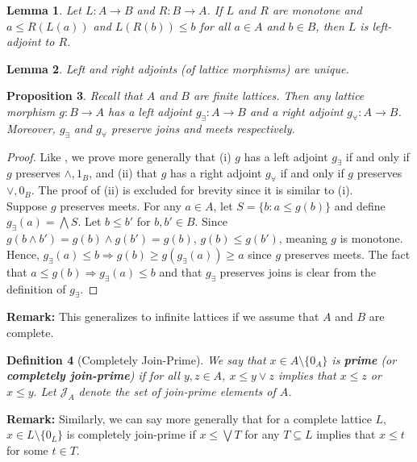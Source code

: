 \documentclass{article}
\newtheorem{proposition}{Proposition}[section]
\newtheorem{lemma}[proposition]{Lemma}
\newtheorem{definition}[proposition]{Definition}
\numberwithin{equation}{section}
\newcommand{\meet}{\wedge}
\newcommand{\join}{\vee}
\newcommand{\bigmeet}{\bigwedge}
\newcommand{\bigjoin}{\bigvee}
\begin{document}
\begin{lemma}
Let $L : A \to B$ and $R : B \to A$. If $L$ and $R$ are monotone and $a \leq R(L(a))$ and $L(R(b)) \leq b$ for all $a \in A$ and $b \in B$, then $L$ is left-adjoint to $R$.
\end{lemma}

\begin{lemma}
Left and right adjoints (of lattice morphisms) are unique.
\end{lemma}

\begin{proposition}
Recall that $A$ and $B$ are finite lattices. Then any lattice morphism $g : B \to A$ has a left adjoint $g_\exists : A \to B$ and a right adjoint $g_\forall : A \to B$. Moreover, $g_\exists$ and $g_\forall$ preserve joins and meets respectively.
\end{proposition}

\begin{proof}
Like , we prove more generally that (i) $g$ has a left adjoint $g_\exists$ if and only if $g$ preserves $\meet, 1_B$, and (ii) that $g$ has a right adjoint $g_\forall$ if and only if $g$ preserves $\join, 0_B$. The proof of (ii) is excluded for brevity since it is similar to (i). \\

Suppose $g$ preserves meets. For any $a \in A$, let $S = \{b : a \leq g(b)\}$ and define $g_\exists(a) = \bigmeet S$. Let $b \leq b'$ for $b, b' \in B$. Since $g(b \meet b') = g(b) \meet g(b') = g(b)$, $g(b) \leq g(b')$, meaning $g$ is monotone. Hence, $g_\exists(a) \leq b \Rightarrow g(b) \geq g(g_\exists(a)) \geq a$ since $g$ preserves meets. The fact that $a \leq g(b) \Rightarrow g_\exists(a) \leq b$ and that $g_\exists$ preserves joins is clear from the definition of $g_\exists$.
\end{proof}

\textbf{Remark:} This generalizes to infinite lattices if we assume that $A$ and $B$ are complete.

\begin{definition}[Completely Join-Prime]
We say that $x \in A \setminus \{0_A\}$ is \textbf{prime} (or \textbf{completely join-prime}) if for all $y, z \in A$, $x \leq y \join z$ implies that $x \leq z$ or $x \leq y.$ Let $\mathcal{J}_A$ denote the set of join-prime elements of $A$. 
\end{definition}

\textbf{Remark:} Similarly, we can say more generally that for a complete lattice $L,$ $x \in L \setminus \{0_L\}$ is completely join-prime if $x \leq \bigjoin T$ for any $T \subseteq L$ implies that $x \leq t$ for some $t \in T.$
\end{document}
